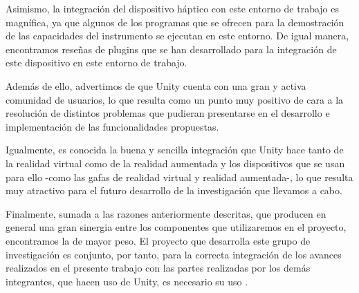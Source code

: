 Asimismo, la integración del dispositivo háptico con este entorno de trabajo es magnífica, ya que algunos de los programas que se ofrecen para la demostración de las capacidades del instrumento se ejecutan en este entorno. De igual manera, encontramos reseñas de plugins que se han desarrollado para la integración de este dispositivo en este entorno de trabajo.

Además de ello, advertimos de que Unity cuenta con una gran y activa comunidad de usuarios, lo que resulta como un punto muy positivo de cara a la resolución de distintos problemas que pudieran presentarse en el desarrollo e implementación de las funcionalidades propuestas.

Igualmente, es conocida la buena y sencilla integración que Unity hace tanto de la realidad virtual como de la realidad aumentada y  los dispositivos que se usan para ello -como las gafas de realidad virtual y realidad aumentada-, lo que resulta muy atractivo para el futuro desarrollo de la investigación que llevamos a cabo.

Finalmente, sumada a las razones anteriormente descritas, que producen en general una gran sinergia entre los componentes que utilizaremos en el proyecto, encontramos la de mayor peso. El proyecto que desarrolla este grupo de investigación es conjunto, por tanto, para la correcta integración de los avances realizados en el presente trabajo con las partes realizadas por los demás integrantes, que hacen uso de Unity, es necesario su uso \cite{54}.

\bigskip
\bigskip
\bigskip
\bigskip
\bigskip
\bigskip
\bigskip
\bigskip
\bigskip
\bigskip
\bigskip
\bigskip
\bigskip
\bigskip
\bigskip
\bigskip



